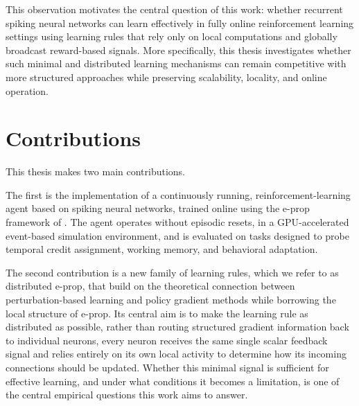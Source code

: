 This observation motivates the central question of this work: whether recurrent spiking neural networks can learn effectively in fully online reinforcement learning settings using learning rules that rely only on local computations and globally broadcast reward-based signals. More specifically, this thesis investigates whether such minimal and distributed learning mechanisms can remain competitive with more structured approaches while preserving scalability, locality, and online operation.

\section{Contributions}

This thesis makes two main contributions.

The first is the implementation of a continuously running, reinforcement-learning agent
based on spiking neural networks, trained online using the e-prop framework of \cite{eprop2020}. The agent operates without episodic resets, in a
GPU-accelerated event-based simulation environment, and is evaluated on tasks designed
to probe temporal credit assignment, working memory, and behavioral adaptation.

The second contribution is a new family of learning rules, which we refer to as distributed
e-prop, that build on the theoretical connection between
perturbation-based learning and policy gradient methods while borrowing the local structure of e-prop. Its central aim is to make
the learning rule as distributed as possible, rather than routing structured gradient
information back to individual neurons, every neuron receives the same single scalar
feedback signal and relies entirely on its own local activity to determine how its
incoming connections should be updated. Whether this minimal signal is sufficient for
effective learning, and under what conditions it becomes a limitation, is one of the central empirical questions this work aims to answer.